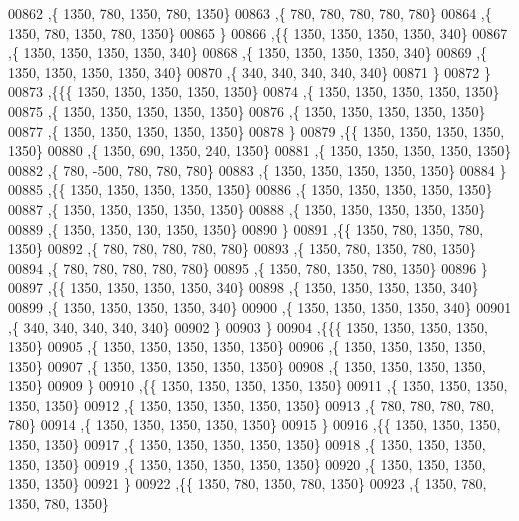 \begin{DoxyCode}
00862    ,\{  1350,   780,  1350,   780,  1350\}
00863    ,\{   780,   780,   780,   780,   780\}
00864    ,\{  1350,   780,  1350,   780,  1350\}
00865    \}
00866   ,\{\{  1350,  1350,  1350,  1350,   340\}
00867    ,\{  1350,  1350,  1350,  1350,   340\}
00868    ,\{  1350,  1350,  1350,  1350,   340\}
00869    ,\{  1350,  1350,  1350,  1350,   340\}
00870    ,\{   340,   340,   340,   340,   340\}
00871    \}
00872   \}
00873  ,\{\{\{  1350,  1350,  1350,  1350,  1350\}
00874    ,\{  1350,  1350,  1350,  1350,  1350\}
00875    ,\{  1350,  1350,  1350,  1350,  1350\}
00876    ,\{  1350,  1350,  1350,  1350,  1350\}
00877    ,\{  1350,  1350,  1350,  1350,  1350\}
00878    \}
00879   ,\{\{  1350,  1350,  1350,  1350,  1350\}
00880    ,\{  1350,   690,  1350,   240,  1350\}
00881    ,\{  1350,  1350,  1350,  1350,  1350\}
00882    ,\{   780,  -500,   780,   780,   780\}
00883    ,\{  1350,  1350,  1350,  1350,  1350\}
00884    \}
00885   ,\{\{  1350,  1350,  1350,  1350,  1350\}
00886    ,\{  1350,  1350,  1350,  1350,  1350\}
00887    ,\{  1350,  1350,  1350,  1350,  1350\}
00888    ,\{  1350,  1350,  1350,  1350,  1350\}
00889    ,\{  1350,  1350,   130,  1350,  1350\}
00890    \}
00891   ,\{\{  1350,   780,  1350,   780,  1350\}
00892    ,\{   780,   780,   780,   780,   780\}
00893    ,\{  1350,   780,  1350,   780,  1350\}
00894    ,\{   780,   780,   780,   780,   780\}
00895    ,\{  1350,   780,  1350,   780,  1350\}
00896    \}
00897   ,\{\{  1350,  1350,  1350,  1350,   340\}
00898    ,\{  1350,  1350,  1350,  1350,   340\}
00899    ,\{  1350,  1350,  1350,  1350,   340\}
00900    ,\{  1350,  1350,  1350,  1350,   340\}
00901    ,\{   340,   340,   340,   340,   340\}
00902    \}
00903   \}
00904  ,\{\{\{  1350,  1350,  1350,  1350,  1350\}
00905    ,\{  1350,  1350,  1350,  1350,  1350\}
00906    ,\{  1350,  1350,  1350,  1350,  1350\}
00907    ,\{  1350,  1350,  1350,  1350,  1350\}
00908    ,\{  1350,  1350,  1350,  1350,  1350\}
00909    \}
00910   ,\{\{  1350,  1350,  1350,  1350,  1350\}
00911    ,\{  1350,  1350,  1350,  1350,  1350\}
00912    ,\{  1350,  1350,  1350,  1350,  1350\}
00913    ,\{   780,   780,   780,   780,   780\}
00914    ,\{  1350,  1350,  1350,  1350,  1350\}
00915    \}
00916   ,\{\{  1350,  1350,  1350,  1350,  1350\}
00917    ,\{  1350,  1350,  1350,  1350,  1350\}
00918    ,\{  1350,  1350,  1350,  1350,  1350\}
00919    ,\{  1350,  1350,  1350,  1350,  1350\}
00920    ,\{  1350,  1350,  1350,  1350,  1350\}
00921    \}
00922   ,\{\{  1350,   780,  1350,   780,  1350\}
00923    ,\{  1350,   780,  1350,   780,  1350\}

\end{DoxyCode}

